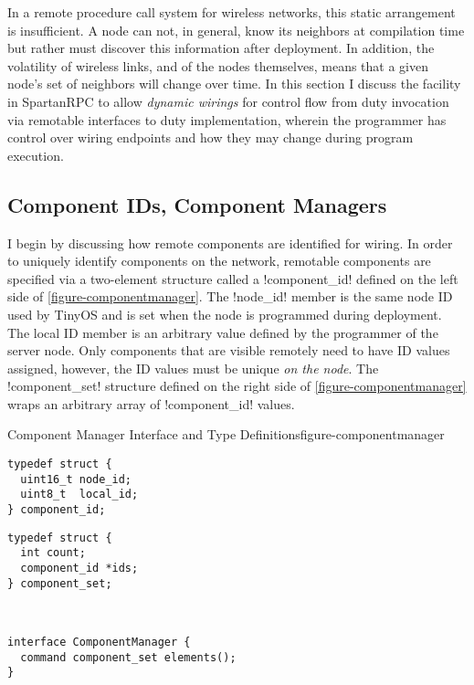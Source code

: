 In a remote procedure call system for wireless networks, this static arrangement is
insufficient. A node can not, in general, know its neighbors at compilation time but rather must
discover this information after deployment. In addition, the volatility of wireless links, and
of the nodes themselves, means that a given node's set of neighbors will change over time. In
this section I discuss the facility in SpartanRPC to allow \emph{dynamic wirings} for control
flow from duty invocation via remotable interfaces to duty implementation, wherein the
programmer has control over wiring endpoints and how they may change during program execution.

\subsection{Component IDs, Component Managers}
\label{section-componentmanager}

I begin by discussing how remote components are identified for wiring. In order to uniquely
identify components on the network, remotable components are specified via a two-element
structure called a !component_id! defined on the left side of \autoref{figure-componentmanager}.
The !node_id! member is the same node ID used by TinyOS and is set when the node is programmed
during deployment. The local ID member is an arbitrary value defined by the programmer of the
server node. Only components that are visible remotely need to have ID values assigned, however,
the ID values must be unique \emph{on the node}. The !component_set! structure defined on the
right side of \autoref{figure-componentmanager} wraps an arbitrary array of !component_id!
values.
 
\begin{fpfig}[t]{Component Manager Interface and Type Definitions}{figure-componentmanager}
{
\begin{minipage}[t]{2.5in}
\singlespace
\begin{lstlisting}
typedef struct {
  uint16_t node_id;
  uint8_t  local_id;
} component_id;
\end{lstlisting}
\primaryspacing
\end{minipage}
\hfill
\begin{minipage}[t]{2.5in}
\singlespace
\begin{lstlisting}
typedef struct {
  int count;
  component_id *ids;
} component_set;
\end{lstlisting}
\primaryspacing
\end{minipage}
\\
\centering
\begin{minipage}[t]{5in}
\vspace{1.5em}
\singlespace
\begin{lstlisting}
interface ComponentManager {
  command component_set elements();
}
\end{lstlisting}
\primaryspacing
\end{minipage}
}
\end{fpfig}

